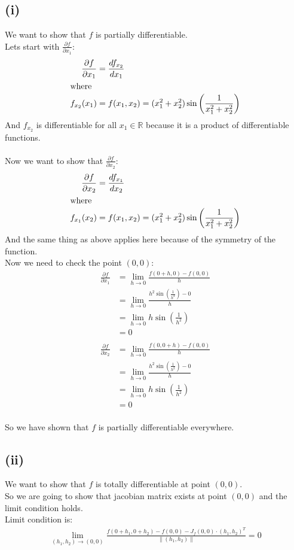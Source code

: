 \documentclass{article}
\begin{document}
\subsection*{(i)}
We want to show that \(f\) is partially differentiable. \\
Lets start with \(\frac{\partial f}{\partial x_1}\):
\begin{align*}
   \frac{\partial f}{\partial x_1} &= \frac{df_{x_2}}{dx_1} \\
   \intertext{where}
   f_{x_2}(x_1) &= f(x_1, x_2) = (x_1^2 + x_2^2) \sin\left(\frac{1}{x_1^2 + x_2^2}\right)
\end{align*}
And \(f_{x_2}\) is differentiable for all \(x_1 \in \mathbb{R}\) because it is a product of differentiable functions. \\
\\
Now we want to show that \(\frac{\partial f}{\partial x_2}\):
\begin{align*}
   \frac{\partial f}{\partial x_2} &= \frac{df_{x_1}}{dx_2} \\
   \intertext{where}
   f_{x_1}(x_2) &= f(x_1, x_2) = (x_1^2 + x_2^2) \sin\left(\frac{1}{x_1^2 + x_2^2}\right)
\end{align*}
And the same thing as above applies here because of the symmetry of the function. \\
Now we need to check the point \((0,0)\):
\begin{align*}
   \frac{\partial f}{\partial x_1} &= \lim_{h \to 0} \frac{f(0 + h, 0) - f(0, 0)}{h} \\
   &= \lim_{h \to 0} \frac{h^2 \sin\left(\frac{1}{h^2}\right) - 0}{h} \\
   &= \lim_{h \to 0} h \sin\left(\frac{1}{h^2}\right) \\
   &= 0 \\
\end{align*}
\begin{align*}
   \frac{\partial f}{\partial x_2} &= \lim_{h \to 0} \frac{f(0, 0 + h) - f(0, 0)}{h} \\
   &= \lim_{h \to 0} \frac{h^2 \sin\left(\frac{1}{h^2}\right) - 0}{h} \\
   &= \lim_{h \to 0} h \sin\left(\frac{1}{h^2}\right) \\
   &= 0 \\
\end{align*}

So we have shown that \(f\) is partially differentiable everywhere.

\subsection*{(ii)}
We want to show that \(f\) is totally differentiable at point \((0,0)\). \\
So we are going to show that jacobian matrix exists at point \((0,0)\) and the limit condition holds. \\
Limit condition is:
\begin{align*}
   \lim_{(h_1, h_2) \to (0,0)} \frac{f(0 + h_1, 0 + h_2) - f(0,0) - J_f(0,0) \cdot (h_1, h_2)^T}{\|(h_1, h_2)\|} = 0
\end{align*}
\end{document}

